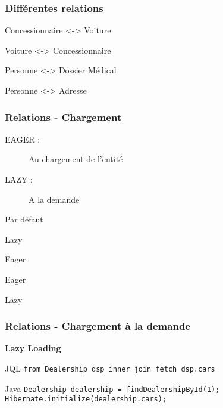\documentclass[t,12pt]{beamer}
\begin{document}
\begin{frame}
	\frametitle{Diff\'erentes relations}

	\begin{description}[ManyToMany :]
		\item[OneToMany :] Concessionnaire <-> Voiture
		\item[ManyToOne :] Voiture <-> Concessionnaire
		\item[OneToOne :] Personne <-> Dossier M\'edical
		\item[ManyToMany :] Personne <-> Adresse
	\end{description}
\end{frame}

\begin{frame}
	\frametitle{Relations - Chargement}

	\begin{description}
		\item[EAGER :] Au chargement de l'entit\'e
		\item[LAZY :] A la demande
	\end{description}

	\begin{block}{Par d\'efaut}
		\begin{description}[ManyToMany :]
			\item[OneToMany :] Lazy
			\item[ManyToOne :] Eager
			\item[OneToOne :] Eager
			\item[ManyToMany :] Lazy
		\end{description}
	\end{block}
\end{frame}

\begin{frame}
	\frametitle{Relations - Chargement \`a la demande}

	\textbf{Lazy Loading}

	\begin{block}{JQL}
		\lstinline{from Dealership dsp inner join fetch dsp.cars}
	\end{block}


	\begin{block}{Java}
		\lstinline{Dealership dealership = findDealershipById(1);}
		\lstinline{Hibernate.initialize(dealership.cars);}
	\end{block}

\end{frame}

\end{document}
